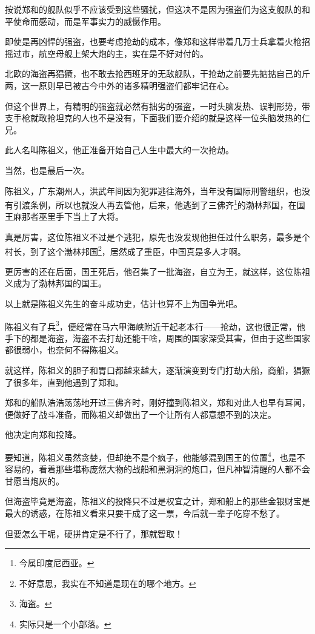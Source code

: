 \begin{multicols}{\theparacolNo}
按说郑和的舰队似乎不应该受到这些骚扰，但这决不是因为强盗们为这支舰队的和平使命而感动，而是军事实力的威慑作用。

即使是再凶悍的强盗，也要考虑抢劫的成本，像郑和这样带着几万士兵拿着火枪招摇过市，航空母舰上架大炮的主，实在是不好对付的。

北欧的海盗再猖獗，也不敢去抢西班牙的无敌舰队，干抢劫之前要先掂掂自己的斤两，这一原则早已被古今中外的诸多精明强盗们都牢记在心。

但这个世界上，有精明的强盗就必然有拙劣的强盗，一时头脑发热、误判形势，带支手枪就敢抢坦克的人也不是没有，下面我们要介绍的就是这样一位头脑发热的仁兄。

此人名叫陈祖义，他正准备开始自己人生中最大的一次抢劫。

当然，也是最后一次。

陈祖义，广东潮州人，洪武年间因为犯罪逃往海外，当年没有国际刑警组织，也没有引渡条例，所以也就没人再去管他，后来，他逃到了三佛齐\footnote{今属印度尼西亚。}的渤林邦国，在国王麻那者巫里手下当上了大将。

真是厉害，这位陈祖义不过是个逃犯，原先也没发现他担任过什么职务，最多是个村长，到了这个渤林邦国\footnote{不好意思，我实在不知道是现在的哪个地方。}，居然成了重臣，中国真是多人才啊。

更厉害的还在后面，国王死后，他召集了一批海盗，自立为王，就这样，这位陈祖义成为了渤林邦国的国王。

以上就是陈祖义先生的奋斗成功史，估计也算不上为国争光吧。

陈祖义有了兵\footnote{海盗。}，便经常在马六甲海峡附近干起老本行——抢劫，这也很正常，他手下的都是海盗，海盗不去打劫还能干啥，周围的国家深受其害，但由于这些国家都很弱小，也奈何不得陈祖义。

就这样，陈祖义的胆子和胃口都越来越大，逐渐演变到专门打劫大船，商船，猖獗了很多年，直到他遇到了郑和。

郑和的船队浩浩荡荡地开过三佛齐时，刚好撞到陈祖义，郑和对此人也早有耳闻，便做好了战斗准备，而陈祖义却做出了一个让所有人都意想不到的决定。

他决定向郑和投降。

要知道，陈祖义虽然贪婪，但却绝不是个疯子，他能够混到国王的位置\footnote{实际只是一个小部落。}，也是不容易的，看着那些堪称庞然大物的战船和黑洞洞的炮口，但凡神智清醒的人都不会甘愿当炮灰的。

但海盗毕竟是海盗，陈祖义的投降只不过是权宜之计，郑和船上的那些金银财宝是最大的诱惑，在陈祖义看来只要干成了这一票，今后就一辈子吃穿不愁了。

但要怎么干呢，硬拼肯定是不行了，那就智取！


\end{multicols}
